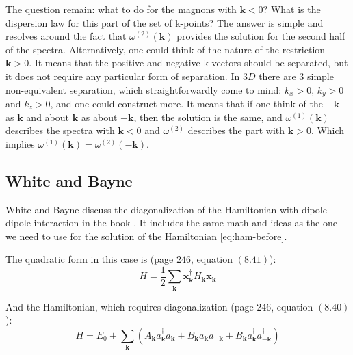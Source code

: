 \documentclass[a4paper,12pt]{article}
\begin{document}
            The question remain: what to do for the magnons with $\boldsymbol{k}<0$? What is the dispersion law for this part of the set of k-points?
            The answer is simple and resolves around the fact that $\omega^{(2)}(\boldsymbol{k})$ provides the solution for the second half of the spectra.
            Alternatively, one could think of the nature of the restriction $ \boldsymbol{k} > 0$. It means that the positive and negative k vectors should be separated, 
            but it does not require any particular form of separation. In $3D$ there are 3 simple non-equivalent separation, 
            which straightforwardly come to mind: $k_x > 0$, $k_y > 0$ and $k_z > 0$, and one could construct more. 
            It means that if one think of the $-\boldsymbol{k}$ as $\boldsymbol{k}$ and about $\boldsymbol{k}$ as about $-\boldsymbol{k}$, 
            then the solution is the same, and $\omega^{(1)}(\boldsymbol{k})$ describes the spectra with $\boldsymbol{k} < 0$ 
            and $\omega^{(2)}$ describes the part with $\boldsymbol{k} > 0$. Which implies $\omega^{(1)}(\boldsymbol{k}) = \omega^{(2)}(-\boldsymbol{k})$.

        \subsection{White and Bayne}\label{sec:white}
            White and Bayne discuss the diagonalization of the Hamiltonian with dipole-dipole interaction in the book \cite{white1983quantum}. 
            It includes the same math and ideas as the one we need to use for the solution of the Hamiltonian \eqref{eq:ham-before}.

            The quadratic form in this case is (page $246$, equation $(8.41)$):
            \begin{equation}
                H = \dfrac{1}{2} \sum_{\boldsymbol{k}} \boldsymbol{x}^{\dag}_{\boldsymbol{k}} H_{\boldsymbol{k}} \boldsymbol{x}_{\boldsymbol{k}} \label{eq:white-quadratic-form}
            \end{equation}

            And the Hamiltonian, which requires diagonalization (page $246$, equation $(8.40)$):
            \begin{equation}
                H = E_0 + \sum_{\boldsymbol{k}} \left(A_{\boldsymbol{k}}a^{\dag}_{\boldsymbol{k}}a_{\boldsymbol{k}} + 
                B_{\boldsymbol{k}}a_{\boldsymbol{k}}a_{-\boldsymbol{k}} + 
                \overline{B_{\boldsymbol{k}}}a^{\dag}_{\boldsymbol{k}}a^{\dag}_{-\boldsymbol{k}}\right)
            \end{equation}
\end{document}
